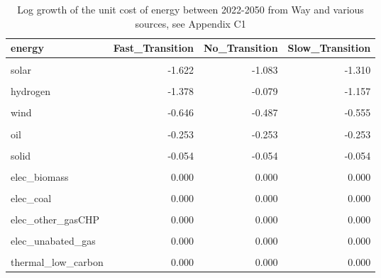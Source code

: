 \documentclass[11pt]{article}
\begin{document}
\begin{table}[!h]
\centering
\caption{Log growth of the unit cost of energy between 2022-2050 from Way and various sources, see Appendix C1}
\label{tab_phat_energy}
\begin{tabular}{lrrr}
\toprule
energy & Fast\_Transition & No\_Transition & Slow\_Transition\\
\midrule
\cellcolor{gray!6}{storage} & \cellcolor{gray!6}{-1.762} & \cellcolor{gray!6}{-0.915} & \cellcolor{gray!6}{-1.511}\\
solar & -1.622 & -1.083 & -1.310\\
\cellcolor{gray!6}{PEM\_electrolysers} & \cellcolor{gray!6}{-1.378} & \cellcolor{gray!6}{-0.079} & \cellcolor{gray!6}{-1.157}\\
hydrogen & -1.378 & -0.079 & -1.157\\
\cellcolor{gray!6}{elec\_hydrogen} & \cellcolor{gray!6}{-1.162} & \cellcolor{gray!6}{-0.073} & \cellcolor{gray!6}{-0.997}\\
\addlinespace
wind & -0.646 & -0.487 & -0.555\\
\cellcolor{gray!6}{non\_bio\_waste} & \cellcolor{gray!6}{-0.260} & \cellcolor{gray!6}{-0.260} & \cellcolor{gray!6}{-0.260}\\
oil & -0.253 & -0.253 & -0.253\\
\cellcolor{gray!6}{gas} & \cellcolor{gray!6}{-0.091} & \cellcolor{gray!6}{-0.091} & \cellcolor{gray!6}{-0.091}\\
solid & -0.054 & -0.054 & -0.054\\
\addlinespace
\cellcolor{gray!6}{bioenergy} & \cellcolor{gray!6}{0.000} & \cellcolor{gray!6}{0.000} & \cellcolor{gray!6}{0.000}\\
elec\_biomass & 0.000 & 0.000 & 0.000\\
\cellcolor{gray!6}{elec\_biomass\_CCS} & \cellcolor{gray!6}{0.000} & \cellcolor{gray!6}{0.000} & \cellcolor{gray!6}{0.000}\\
elec\_coal & 0.000 & 0.000 & 0.000\\
\cellcolor{gray!6}{elec\_gas\_CCS} & \cellcolor{gray!6}{0.000} & \cellcolor{gray!6}{0.000} & \cellcolor{gray!6}{0.000}\\
\addlinespace
elec\_other\_gasCHP & 0.000 & 0.000 & 0.000\\
\cellcolor{gray!6}{elec\_other\_hydro} & \cellcolor{gray!6}{0.000} & \cellcolor{gray!6}{0.000} & \cellcolor{gray!6}{0.000}\\
elec\_unabated\_gas & 0.000 & 0.000 & 0.000\\
\cellcolor{gray!6}{Nuclear} & \cellcolor{gray!6}{0.000} & \cellcolor{gray!6}{0.000} & \cellcolor{gray!6}{0.000}\\
thermal\_low\_carbon & 0.000 & 0.000 & 0.000\\
\bottomrule
\end{tabular}
\end{table}

\newpage
\renewcommand\bibname{References}


\normalsize
\end{document}
